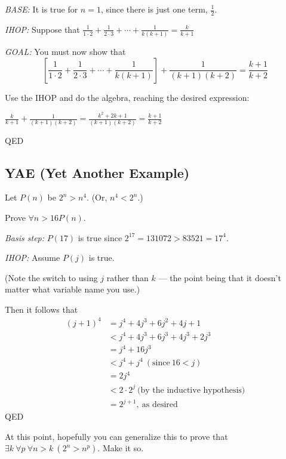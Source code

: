 \documentclass[12pt]{amsart}
\begin{document}
\textit{BASE:} It is true for $n = 1$, since there is just one term, $\frac{1}{2}$.

\textit{IHOP:} Suppose that $\frac{1}{1 \cdot 2} + \frac{1}{2 \cdot 3} + \cdots +
\frac{1}{k(k + 1)} = \frac{k}{k + 1}$

\textit{GOAL:} You must now show that \[\left[
  \frac{1}{1 \cdot 2} + \frac{1}{2 \cdot 3} + \cdots + \frac{1}{k(k +
    1)}\right] + \frac{1}{(k + 1)(k + 2)} = \frac{k + 1}{k + 2}\]

Use the IHOP and do the algebra, reaching the desired expression:

$\frac{k}{k + 1} + \frac{1}{(k + 1)(k + 2)} = \frac{k^2 + 2k + 1}{(k + 1)(k + 2)} = \frac{k + 1}{k + 2}$

QED

\subsection{YAE (Yet Another Example)}

Let $P(n)$ be $2^n > n^4$. (Or, $n^4 < 2^n$.)

Prove $\forall n>16 P(n)$.

\textit{Basis step:} $P(17)$ is true since $2^{17} = 131072 > 83521 = 17^4$.

\textit{IHOP:} Assume $P(j)$ is true.

(Note the switch to using $j$ rather than $k$ --- the point being that it
doesn't matter what variable name you use.)

Then it follows that \begin{align}
(j + 1)^4 &= j^4 + 4j^3 + 6j^2 + 4j + 1\\
&< j^4 + 4j^3 + 6j^3 + 4j^3 + 2j^3\\
&= j^4 + 16j^3\\
&< j^4 + j^4\ (\mbox{since}\ 16 < j)\\
&= 2j^4\\
&< 2 \cdot 2^j\ \mbox{(by the inductive hypothesis)}\\
&= 2^{j+1},\ \mbox{as desired}
\end{align}
QED

At this point, hopefully you can generalize this to prove that $\exists k\ \forall p\
\forall n>k\ (2^n > n^p).$ Make it so.
\end{document}
